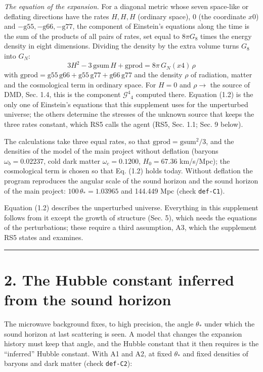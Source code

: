 \documentclass[
  10pt,
]{article}
\begin{document}
\emph{The equation of the expansion.} For a diagonal metric whose seven
space-like or deflating directions have the rates \(H,H,H\) (ordinary
space), \(0\) (the coordinate \(x0\)) and
\(-\mathrm{g55},-\mathrm{g66},-\mathrm{g77}\), the component of
Einstein's equations along the time is the sum of the products of all
pairs of rates, set equal to \(8\pi G_8\) times the energy density in
eight dimensions. Dividing the density by the extra volume turns \(G_8\)
into \(G_N\):
\[\boxed{\;3H^2-3\,\mathrm{gsum}\,H+\mathrm{gprod}=8\pi\,G_N(x4)\,\rho\;}\tag{1.2}\]
with
\(\mathrm{gprod}=\mathrm{g55}\,\mathrm{g66}+\mathrm{g55}\,\mathrm{g77}+\mathrm{g66}\,\mathrm{g77}\)
and the density \(\rho\) of radiation, matter and the cosmological term
in ordinary space. For \(H=0\) and \(\rho\to\) the source of DMD, Sec.
1.4, this is the component \(\mathcal G^4{}_4\) computed there. Equation
(1.2) is the only one of Einstein's equations that this supplement uses
for the unperturbed universe; the others determine the stresses of the
unknown source that keeps the three rates constant, which RS5 calls the
agent (RS5, Sec. 1.1; Sec. 9 below).

The calculations take three equal rates, so that
\(\mathrm{gprod}=\mathrm{gsum}^2/3\), and the densities of the model of
the main project without deflation (baryons \(\omega_b=0.02237\), cold
dark matter \(\omega_c=0.1200\), \(H_0=67.36\) km/s/Mpc); the
cosmological term is chosen so that Eq. (1.2) holds today. Without
deflation the program reproduces the angular scale of the sound horizon
and the sound horizon of the main project: \(100\,\theta_*=1.03965\) and
144.449 Mpc (check \texttt{def-C1}).

Equation (1.2) describes the unperturbed universe. Everything in this
supplement follows from it except the growth of structure (Sec. 5),
which needs the equations of the perturbations; these require a third
assumption, A3, which the supplement RS5 states and examines.

\begin{center}\rule{0.5\linewidth}{0.5pt}\end{center}

\hypertarget{the-hubble-constant-inferred-from-the-sound-horizon}{%
\section{2. The Hubble constant inferred from the sound
horizon}\label{the-hubble-constant-inferred-from-the-sound-horizon}}

The microwave background fixes, to high precision, the angle
\(\theta_*\) under which the sound horizon at last scattering is seen. A
model that changes the expansion history must keep that angle, and the
Hubble constant that it then requires is the ``inferred'' Hubble
constant. With A1 and A2, at fixed \(\theta_*\) and fixed densities of
baryons and dark matter (check \texttt{def-C2}):
\end{document}
